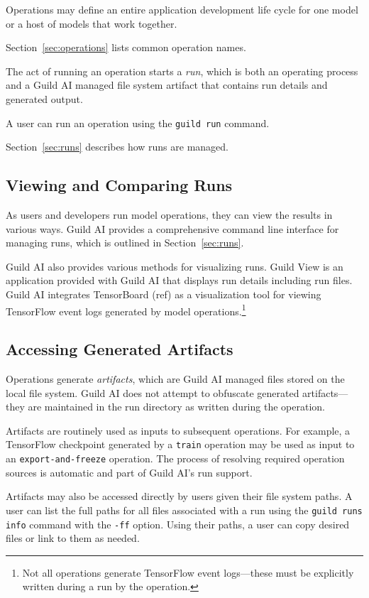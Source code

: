 \documentclass{article}
\begin{document}
Operations may define an entire application development life cycle for
one model or a host of models that work together.

Section~\ref{sec:operations} lists common operation names.

The act of running an operation starts a \emph{run}, which is both an
operating process and a Guild AI managed file system artifact that
contains run details and generated output.

A user can run an operation using the \verb|guild run| command.

Section~\ref{sec:runs} describes how runs are managed.

\subsection{Viewing and Comparing Runs}

As users and developers run model operations, they can view the
results in various ways. Guild AI provides a comprehensive command
line interface for managing runs, which is outlined in
Section~\ref{sec:runs}.

Guild AI also provides various methods for visualizing runs. Guild
View is an application provided with Guild AI that displays run
details including run files. Guild AI integrates TensorBoard (ref) as
a visualization tool for viewing TensorFlow event logs generated by
model operations.\footnote{Not all operations generate TensorFlow
  event logs---these must be explicitly written during a run by the
  operation.}

\subsection{Accessing Generated Artifacts}

Operations generate \emph{artifacts}, which are Guild AI managed files
stored on the local file system. Guild AI does not attempt to
obfuscate generated artifacts---they are maintained in the run
directory as written during the operation.

Artifacts are routinely used as inputs to subsequent operations. For
example, a TensorFlow checkpoint generated by a \verb|train| operation
may be used as input to an \verb|export-and-freeze| operation. The
process of resolving required operation sources is automatic and part
of Guild AI's run support.

Artifacts may also be accessed directly by users given their file
system paths. A user can list the full paths for all files associated
with a run using the \verb|guild runs info| command with the
\verb|-ff| option. Using their paths, a user can copy desired files or
link to them as needed.
\end{document}
